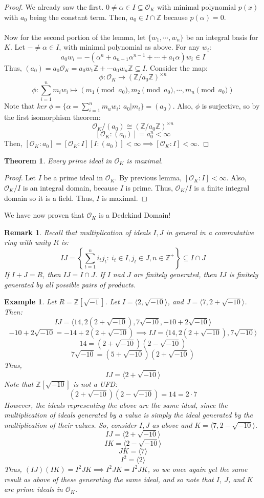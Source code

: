 \documentclass{article}
\newcommand{\air}{\mathcal{O}_K}
\newcommand{\Z}{\mathbb{Z}}
\newtheorem{theorem}{Theorem}[subsection]
\newtheorem{remark}{Remark}[subsection]
\newtheorem{example}{Example}[subsection]
\begin{document}
\begin{proof}
We already saw the first. $0\neq \alpha\in I\subseteq \air$ with minimal polynomial $p(x)$ with $a_0$ being the constant term. Then, $a_0\in I\cap \Z$ because $p(\alpha)=0$.
\\
\\
Now for the second portion of the lemma, let $\{w_1,\cdots, w_n\}$ be an integral basis for $K$. Let $-\neq \alpha\in I$, with minimal polynomial as above. For any $w_i$:
$$a_0w_i= -(\alpha^n+a_{n-1}\alpha^{n-1}+\cdots +a_1\alpha)w_i\in I$$
Thus, $(a_0)=a_0\air= a_0w_1\Z +\cdots a_0w_n\Z\subseteq I$. Consider the map:
$$\phi: \air \rightarrow (\Z/a_0\Z)^{\times n}$$
$$\phi: \sum_{i=1}^n m_iw_i\mapsto (m_1\pmod{a_0}, m_2\pmod{a_0},\cdots , m_n\pmod{a_0})$$
Note that $ker\ \phi = \{\alpha=\displaystyle\sum_{i=1}^n m_uw_i:\ a_0| m_i\} = (a_0)$. Also, $\phi$ is surjective, so by the first isomorphism theorem:
$$\air/(a_0)\cong (\Z/a_0\Z)^{\times n}$$
$$[\air : (a_0)]=a_0^n <\infty$$
Then, $[\air : a_0]=[\air : I][I: (a_0)]<\infty \implies [\air : I]<\infty$.
\end{proof}
\newpage
\begin{theorem}
Every prime ideal in $\air$ is maximal. 
\end{theorem}
\begin{proof}
Let $I$ be a prime ideal in $\air$. By previous lemma, $[\air : I]<\infty$. Also, $\air/ I$ is an integral domain, because $I$ is prime. Thus, $\air/ I$ is a finite integral domain so it is a field. Thus, $I$ is maximal.
\end{proof}
We have now proven that $\air$ is a Dedekind Domain! 
\begin{remark}
Recall that multiplication of ideals $I,J$ in general in a commutative ring with unity $R$ is:
$$IJ = \left\{\sum_{t=1}^n i_tj_t:\ i_t\in I, j_t\in J,n\in \Z^+\right\}\subseteq I\cap J$$
If $I+J=R$, then $IJ=I\cap J$. If $I$ nad $J$ are finitely generated, then $IJ$ is finitely generated by all possible pairs of products.
\end{remark}
\begin{example}
Let $R=\Z[\sqrt{-1}]$. Let $I=\langle 2,\sqrt{-10}\rangle$, and $J=\langle 7, 2+\sqrt{-10}\rangle$. Then:
$$IJ=\langle 14, 2(2+\sqrt{-10}), 7\sqrt{-10}, -10+2\sqrt{-10}\rangle$$
$$-10+2\sqrt{-10}= -14+2(2+\sqrt{-10})\implies IJ = \langle 14, 2(2+\sqrt{-10}), 7\sqrt{-10}\rangle$$
$$14=(2+\sqrt{-10})(2-\sqrt{-10})$$
$$7\sqrt{-10}=(5+\sqrt{-10})(2+\sqrt{-10})$$
Thus, 
$$IJ = \langle 2+\sqrt{-10}\rangle$$
Note that $\Z[\sqrt{-10}]$ is not a UFD:
$$(2+\sqrt{-10})(2-\sqrt{-10})=14 = 2\cdot 7$$
However, the ideals representing the above are the same ideal, since the multiplication of ideals generated by a value is simply the ideal generated by the multiplication of their values. So, consider $I,J$ as above and $K=\langle 7, 2-\sqrt{-10}\rangle$. 
$$IJ = \langle 2+\sqrt{-10}\rangle$$
$$IK= \langle 2 - \sqrt{-10}\rangle$$
$$JK = \langle 7\rangle$$
$$I^2 = \langle 2\rangle$$
Thus, $(IJ)(IK)=I^2JK\implies I^2JK=I^2JK$, so we once again get the same result as above of these generating the same ideal, and so note that $I$, $J$, and $K$ are prime ideals in $\air$.
\end{example}
\newpage
\end{document}

